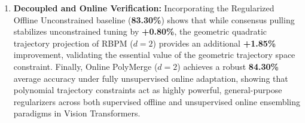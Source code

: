 \begin{enumerate}
    \item \textbf{Decoupled and Online Verification:} Incorporating the Regularized Offline Unconstrained baseline (\textbf{83.30\%}) shows that while consensus pulling stabilizes unconstrained tuning by \textbf{+0.80\%}, the geometric quadratic trajectory projection of RBPM ($d=2$) provides an additional \textbf{+1.85\%} improvement, validating the essential value of the geometric trajectory space constraint. Finally, Online PolyMerge ($d=2$) achieves a robust \textbf{84.30\%} average accuracy under fully unsupervised online adaptation, showing that polynomial trajectory constraints act as highly powerful, general-purpose regularizers across both supervised offline and unsupervised online ensembling paradigms in Vision Transformers.
\end{enumerate}
